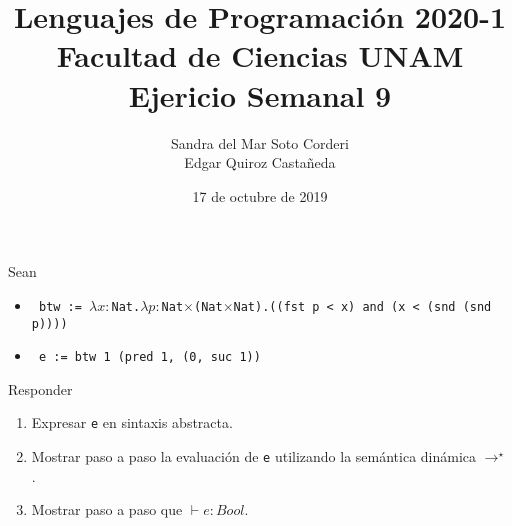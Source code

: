\documentclass{article}
\title{
    Lenguajes de Programación 2020-1\\
    Facultad de Ciencias UNAM\\
    Ejericio Semanal 9
}
\author{
    Sandra del Mar Soto Corderi\\
    Edgar Quiroz Castañeda
}
\date{
    17 de octubre de 2019
}
\newcommand{\lm}{\lambda}
\newcommand{\x}{\times}
\begin{document}
    \maketitle

    Sean

    \begin{itemize}
        \item \texttt{
            btw := $\lm x : $Nat.$\lm p : $Nat$ \x $(Nat$ \x $Nat).((fst p < x)
            and (x < (snd (snd p))))
        }

        \item \texttt{
            e := btw 1 (pred 1, (0, suc 1))
        }
    \end{itemize}

    Responder

    \begin{enumerate}
        \item {
            Expresar \texttt{e} en sintaxis abstracta.
        }
        \item {
            Mostrar paso a paso la evaluación de \texttt{e} utilizando la
            semántica dinámica $\rightarrow^{\star}$.
        }
        \item {
            Mostrar paso a paso que $\vdash e : Bool$.
        }
    \end{enumerate}
\end{document}
